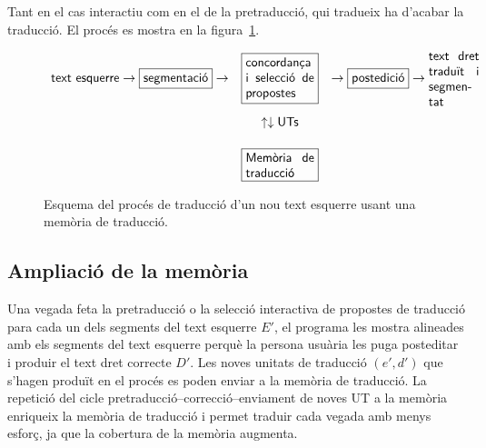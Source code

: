 Tant en el cas interactiu com en el de la pretraducció, qui tradueix
ha d'acabar la traducció. El procés es mostra en la
figura~\ref{fg:preMT}.
\begin{figure}
{\small
$$
\begin{array}{rcl}
\mbox{\textsf{text esquerre}} \to
\mbox{\framebox{\textsf{segmentació}}} \to &
\mbox{\framebox{\parbox{1.9cm}{\textsf{concordança i selecció de propostes}}}} & \to \mbox{\framebox{\textsf{postedició}}} \to \mbox{\parbox{1.4cm}{\textsf{text dret
    traduït i segmentat}}} \\[0.8cm]
& \uparrow \downarrow \mbox{\textsf{UTs}}& \\[0.5cm]
& \mbox{\framebox{\parbox{1.9cm}{\textsf{Memòria de traducció}}}} & \\
\end{array}
$$
}
\caption{Esquema del procés de traducció d'un nou text esquerre usant
  una memòria de traducció.}
\label{fg:preMT}
\end{figure}



\subsection{Ampliació de la memòria}

Una vegada feta la pretraducció o la selecció interactiva de propostes
de traducció para cada un dels segments del text esquerre $E'$, el
programa les mostra alineades amb els segments del text esquerre
perquè la persona usuària les puga posteditar i produir el text dret
correcte $D'$. Les noves unitats de traducció $(e',d')$ que s'hagen
produït en el procés es poden enviar a la memòria de traducció.  La
repetició del cicle pretraducció--correcció--enviament de noves UT a
la memòria enriqueix la memòria de traducció i permet traduir cada
vegada amb menys esforç, ja que la cobertura de la memòria augmenta.



